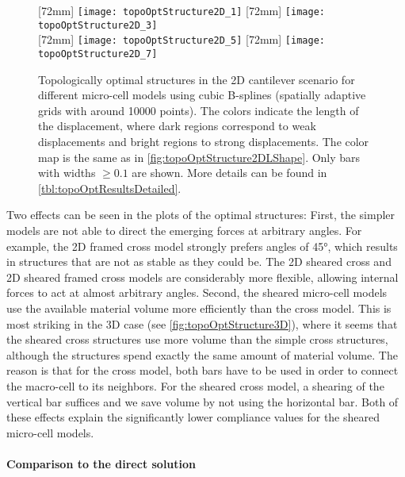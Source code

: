 \begin{figure}
  [72mm]{%
    \texttt{[image: topoOptStructure2D\_1]}%
  }%
  \hfill%
  [72mm]{%
    \texttt{[image: topoOptStructure2D\_3]}%
  }%
  \\[2mm]%
  [72mm]{%
    \texttt{[image: topoOptStructure2D\_5]}%
  }%
  \hfill%
  [72mm]{%
    \texttt{[image: topoOptStructure2D\_7]}%
  }%
  \caption[Optimal structures in the 2D cantilever scenario]{%
    Topologically optimal structures in the 2D cantilever scenario
    for different micro-cell models using cubic B-splines
    (spatially adaptive grids with around \num{10000} points).
    The colors indicate the length of the displacement,
    where dark regions correspond to weak displacements and
    bright regions to strong displacements.
    The color map is the same as in
    \cref{fig:topoOptStructure2DLShape}.
    Only bars with widths $\ge 0.1$ are shown.
    More details can be found in \cref{tbl:topoOptResultsDetailed}.%
  }%
  \label{fig:topoOptStructure2DCantilever}%
\end{figure}

Two effects can be seen in the plots of the optimal structures:
First, the simpler models are not able to direct the emerging forces at
arbitrary angles.
For example, the 2D framed cross model strongly prefers
angles of \ang{45}, which results in structures that are not as stable
as they could be.
The 2D sheared cross and 2D sheared framed cross models
are considerably more flexible, allowing
internal forces to act at almost arbitrary angles.
Second, the sheared micro-cell models use the available
material volume more efficiently than the cross model.
This is most striking in the 3D case (see \cref{fig:topoOptStructure3D}),
where it seems that the sheared cross structures
use more volume than the simple cross structures,
although the structures spend exactly the same amount of material volume.
The reason is that for the cross model, both bars
have to be used in order to connect the macro-cell to its neighbors.
For the sheared cross model, a shearing of the vertical bar suffices
and we save volume by not using the horizontal bar.
Both of these effects explain the significantly lower compliance
values for the sheared micro-cell models.

\paragraph{Comparison to the direct solution}

